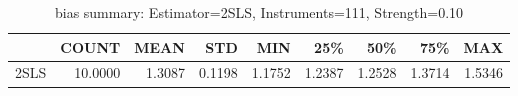 \begin{table}[ht]
\centering
\caption{bias summary: Estimator=2SLS, Instruments=111, Strength=0.10}
\begin{tabular}{lrrrrrrrr}
\toprule
 & COUNT & MEAN & STD & MIN & 25\% & 50\% & 75\% & MAX \\
\midrule
2SLS & 10.0000 & 1.3087 & 0.1198 & 1.1752 & 1.2387 & 1.2528 & 1.3714 & 1.5346 \\
\bottomrule
\end{tabular}
\end{table}
